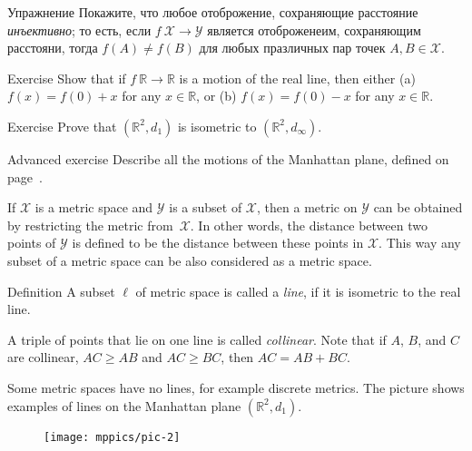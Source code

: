 \begin{thm}{Упражнение}\label{ex:dist-preserv=>injective}
Покажите, что любое отоброжение, сохраняющие расстояние \emph{инъективно};
то есть, если $f\:\mathcal X\to\mathcal Y$ является отоброженеим, сохраняющим расстояни, 
тогда $f(A)\ne f(B)$ для любых празличных пар точек $A, B\in \mathcal X$.
\end{thm}

\begin{thm}{Exercise}\label{ex:motion-of-R}
Show that if $f\:\mathbb{R}\to\mathbb{R}$ is a motion of the real line,
then either (a)
$f(x)=f(0)+x$ for any $x\in \mathbb{R}$, 
or (b)
$f(x)=f(0)-x$ for any $x\in \mathbb{R}$. 

\end{thm}

\begin{thm}{Exercise}\label{ex:d_1=d_infty}
Prove that $(\mathbb{R}^2,d_1)$ is isometric to $(\mathbb{R}^2,d_\infty)$.
\end{thm}

\begin{thm}{Advanced exercise}\label{ad-ex:motions of Manhattan plane}
Describe all the motions of the Manhattan plane, defined on page~\pageref{Manhattan plane}.
\end{thm}

If $\mathcal X$ is a metric space and $\mathcal Y$ is a subset of $\mathcal X$,
then a metric on $\mathcal Y$ can be obtained by restricting the metric from~$\mathcal X$. 
In other words, 
the distance between two points of $\mathcal Y$ is defined to be the distance between these points in $\mathcal X$.
This way any subset of a metric space can be also considered as a metric space. 

\begin{thm}{Definition}\label{def:line}
A subset $\ell$ of metric space is called a \emph{line}, if it is isometric to the real line.
\end{thm}

A triple of points that lie on one line is called \emph{collinear}.
Note that if $A$, $B$, and  $C$ are  collinear, $AC\ge AB$ and $AC\ge BC$, then $AC= AB+BC$.

Some metric spaces have no lines, for example discrete metrics.
The picture shows examples of lines on the Manhattan plane $(\mathbb{R}^2,d_1)$. 
\begin{figure}[h!]
\centering
\texttt{[image: mppics/pic-2]}
\end{figure}

